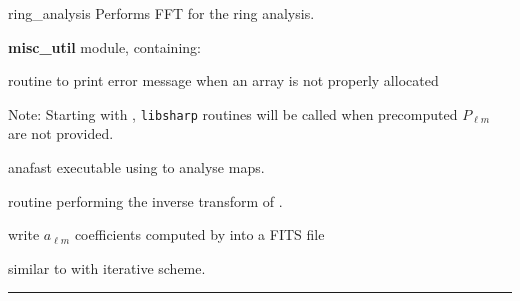 \begin{modules}
  \begin{sulist}{} %
  \item[ring\_analysis] Performs FFT for the ring analysis.
  \item[\textbf{misc\_util}] module, containing:
  \item[\htmlref{assert\_alloc}{sub:assert}] routine to print error message when an array is not
  properly allocated		
  \end{sulist}
Note: Starting with , {\tt libsharp} routines will be called when precomputed $P_{\ell m}$ are not provided.
\end{modules}

\begin{related}
  \begin{sulist}{} %
  \item[anafast] executable using \thedocid{} to analyse maps.
  \item[\htmlref{alm2map}{sub:alm2map}] routine performing the inverse transform
of \thedocid.
  \item[\htmlref{dump\_alms}{sub:dump_alms}] write $a_{\ell m}$ coefficients
computed by \thedocid{} into a FITS file
  \item[\htmlref{map2alm\_iterative}{sub:map2alm_iterative}] similar to
\thedocid{} with iterative scheme.
  \end{sulist}
\end{related}

\rule{\hsize}{2mm}

\newpage
